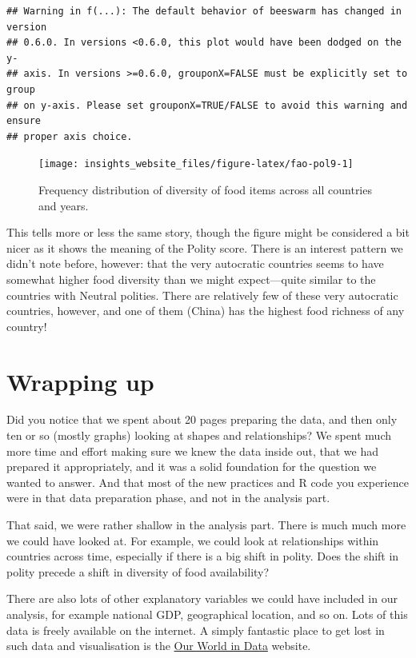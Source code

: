 \documentclass[]{book}
\begin{document}
\begin{verbatim}
## Warning in f(...): The default behavior of beeswarm has changed in version
## 0.6.0. In versions <0.6.0, this plot would have been dodged on the y-
## axis. In versions >=0.6.0, grouponX=FALSE must be explicitly set to group
## on y-axis. Please set grouponX=TRUE/FALSE to avoid this warning and ensure
## proper axis choice.
\end{verbatim}

\begin{figure}

{\centering \texttt{[image: insights\_website\_files/figure-latex/fao-pol9-1]} 

}

\caption{Frequency distribution of diversity of food items across all countries and years.}\label{fig:fao-pol9}
\end{figure}

This tells more or less the same story, though the figure might be considered a bit nicer as it shows the meaning of the Polity score. There is an interest pattern we didn't note before, however: that the very autocratic countries seems to have somewhat higher food diversity than we might expect---quite similar to the countries with Neutral polities. There are relatively few of these very autocratic countries, however, and one of them (China) has the highest food richness of any country!

\hypertarget{wrapping-up}{%
\section{Wrapping up}\label{wrapping-up}}

Did you notice that we spent about 20 pages preparing the data, and then only ten or so (mostly graphs) looking at shapes and relationships? We spent much more time and effort making sure we knew the data inside out, that we had prepared it appropriately, and it was a solid foundation for the question we wanted to answer. And that most of the new practices and R code you experience were in that data preparation phase, and not in the analysis part.

That said, we were rather shallow in the analysis part. There is much much more we could have looked at. For example, we could look at relationships within countries across time, especially if there is a big shift in polity. Does the shift in polity precede a shift in diversity of food availability?

There are also lots of other explanatory variables we could have included in our analysis, for example national GDP, geographical location, and so on. Lots of this data is freely available on the internet. A simply fantastic place to get lost in such data and visualisation is the \href{https://ourworldindata.org/}{Our World in Data} website.
\end{document}
